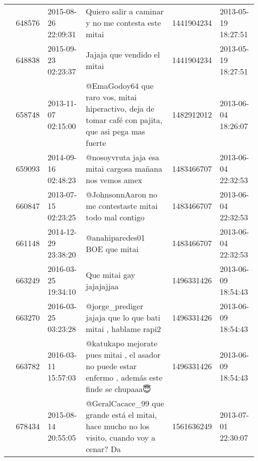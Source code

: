 \begin{tabular}{llllrl}
           & 648576  & 2015-08-26 22:09:31 &                                                                                           Quiero salir a caminar y no me contesta este mitai &  1441904234 & 2013-05-19 18:27:51 \\
           & 648838  & 2015-09-23 02:23:37 &                                                                                                                  Jajaja que vendido el mitai &  1441904234 & 2013-05-19 18:27:51 \\
           & 658748  & 2013-11-07 02:15:00 &                                          @EmaGodoy64 que raro vos, mitai hiperactivo, deja de tomar café con pajita, que asi pega mas fuerte &  1482912012 & 2013-06-04 18:26:07 \\
           & 659093  & 2014-09-16 02:48:23 &                                                                                     @nosoyvruta jaja esa mitai cargosa mañana nos vemos amex &  1483466707 & 2013-06-04 22:32:53 \\
           & 660847  & 2013-07-15 02:23:25 &                                                                                      @JohnsonnAaron no me contestaste mitai todo mal contigo &  1483466707 & 2013-06-04 22:32:53 \\
           & 661148  & 2014-12-29 23:38:20 &                                                                                                                @anahiparedes01 BOE que mitai &  1483466707 & 2013-06-04 22:32:53 \\
           & 663249  & 2016-03-25 19:34:10 &                                                                                                                     Que mitai gay jajajajjaa &  1496331426 & 2013-06-09 18:54:43 \\
           & 663270  & 2016-03-25 03:23:28 &                                                                                 @jorge\_prediger jajaja que lo que bati mitai , hablame rapi2 &  1496331426 & 2013-06-09 18:54:43 \\
           & 663782  & 2016-03-11 15:57:03 &                                             @katukapo mejorate pues mitai , el asador no puede estar enfermo , además este finde se chupaaa😇 &  1496331426 & 2013-06-09 18:54:43 \\
           & 678434  & 2015-08-14 20:55:05 &                                                   @GeralCacace\_99 que grande está el mitai, hace mucho no los visito, cuando voy a cenar? Da &  1561636249 & 2013-07-01 22:30:07 \\

\end{tabular}
